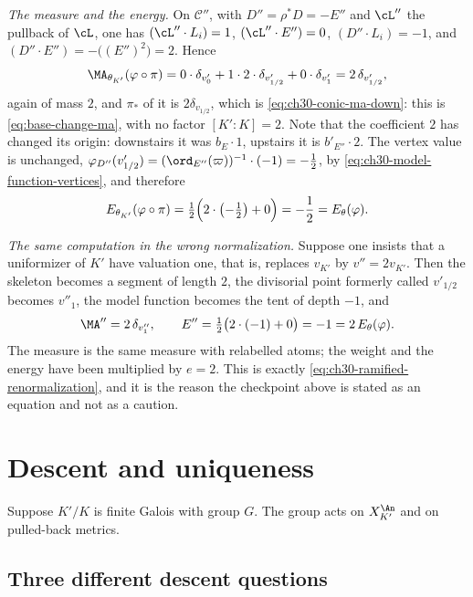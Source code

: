 \begin{example}
\emph{The measure and the energy.}  On \(\mathcal C''\), with
\(D''=\rho^*D=-E''\) and \(\cL''\) the pullback of \(\cL\), one has
\((\cL''\cdot L_i)=1\), \((\cL''\cdot E'')=0\), \((D''\cdot L_i)=-1\), and
\((D''\cdot E'')=-\bigl((E'')^2\bigr)=2\).  Hence
\begin{equation}
\label{eq:ch30-conic-ma-up}
 \MA_{\theta_{K'}}(\varphi\circ\pi)
 =0\cdot\delta_{v'_0}+1\cdot 2\cdot\delta_{v'_{1/2}}+0\cdot\delta_{v'_1}
 =2\,\delta_{v'_{1/2}},
\end{equation}
again of mass \(2\), and \(\pi_*\) of it is \(2\delta_{v_{1/2}}\), which is
\eqref{eq:ch30-conic-ma-down}: this is \eqref{eq:base-change-ma}, with no
factor \([K':K]=2\).  Note that the coefficient \(2\) has changed its
origin: downstairs it was \(b_E\cdot1\), upstairs it is
\(b'_{E''}\cdot2\).  The vertex value is unchanged,
\(\varphi_{D''}(v'_{1/2})=(\ord_{E''}(\varpi))^{-1}\cdot(-1)=-\tfrac12\),
by \eqref{eq:ch30-model-function-vertices}, and therefore
\begin{equation}
\label{eq:ch30-conic-energy-up}
 E_{\theta_{K'}}(\varphi\circ\pi)
 =\tfrac12\Bigl(2\cdot\bigl(-\tfrac12\bigr)+0\Bigr)=-\frac12
 =E_\theta(\varphi).
\end{equation}

\emph{The same computation in the wrong normalization.}  Suppose one
insists that a uniformizer of \(K'\) have valuation one, that is, replaces
\(v_{K'}\) by \(v''=2v_{K'}\).  Then the skeleton becomes a segment of
length \(2\), the divisorial point formerly called \(v'_{1/2}\) becomes
\(v''_1\), the model function becomes the tent of depth \(-1\), and
\[
 \MA''=2\,\delta_{v''_1},
 \qquad
 E''=\tfrac12\bigl(2\cdot(-1)+0\bigr)=-1=2\,E_\theta(\varphi).
\]
The measure is the same measure with relabelled atoms; the weight and the
energy have been multiplied by \(e=2\).  This is exactly
\eqref{eq:ch30-ramified-renormalization}, and it is the reason the
checkpoint above is stated as an equation and not as a caution.
\end{example}

\section{Descent and uniqueness}
\label{sec:ch30-descent}

Suppose \(K'/K\) is finite Galois with group \(G\).  The group acts on
\(X_{K'}^{\An}\) and on pulled-back metrics.

\subsection{Three different descent questions}
\label{sec:ch30-descent-questions}

